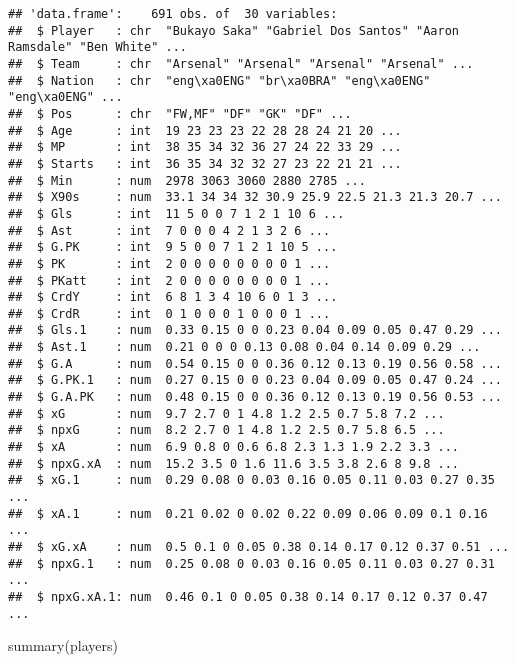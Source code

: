 \documentclass[
]{article}
\newenvironment{Shaded}{\begin{snugshade}}{\end{snugshade}}
\newcommand{\FunctionTok}[1]{\textcolor[rgb]{0.00,0.00,0.00}{#1}}
\newcommand{\NormalTok}[1]{#1}
\begin{document}
\begin{verbatim}
## 'data.frame':    691 obs. of  30 variables:
##  $ Player   : chr  "Bukayo Saka" "Gabriel Dos Santos" "Aaron Ramsdale" "Ben White" ...
##  $ Team     : chr  "Arsenal" "Arsenal" "Arsenal" "Arsenal" ...
##  $ Nation   : chr  "eng\xa0ENG" "br\xa0BRA" "eng\xa0ENG" "eng\xa0ENG" ...
##  $ Pos      : chr  "FW,MF" "DF" "GK" "DF" ...
##  $ Age      : int  19 23 23 23 22 28 28 24 21 20 ...
##  $ MP       : int  38 35 34 32 36 27 24 22 33 29 ...
##  $ Starts   : int  36 35 34 32 32 27 23 22 21 21 ...
##  $ Min      : num  2978 3063 3060 2880 2785 ...
##  $ X90s     : num  33.1 34 34 32 30.9 25.9 22.5 21.3 21.3 20.7 ...
##  $ Gls      : int  11 5 0 0 7 1 2 1 10 6 ...
##  $ Ast      : int  7 0 0 0 4 2 1 3 2 6 ...
##  $ G.PK     : int  9 5 0 0 7 1 2 1 10 5 ...
##  $ PK       : int  2 0 0 0 0 0 0 0 0 1 ...
##  $ PKatt    : int  2 0 0 0 0 0 0 0 0 1 ...
##  $ CrdY     : int  6 8 1 3 4 10 6 0 1 3 ...
##  $ CrdR     : int  0 1 0 0 0 1 0 0 0 1 ...
##  $ Gls.1    : num  0.33 0.15 0 0 0.23 0.04 0.09 0.05 0.47 0.29 ...
##  $ Ast.1    : num  0.21 0 0 0 0.13 0.08 0.04 0.14 0.09 0.29 ...
##  $ G.A      : num  0.54 0.15 0 0 0.36 0.12 0.13 0.19 0.56 0.58 ...
##  $ G.PK.1   : num  0.27 0.15 0 0 0.23 0.04 0.09 0.05 0.47 0.24 ...
##  $ G.A.PK   : num  0.48 0.15 0 0 0.36 0.12 0.13 0.19 0.56 0.53 ...
##  $ xG       : num  9.7 2.7 0 1 4.8 1.2 2.5 0.7 5.8 7.2 ...
##  $ npxG     : num  8.2 2.7 0 1 4.8 1.2 2.5 0.7 5.8 6.5 ...
##  $ xA       : num  6.9 0.8 0 0.6 6.8 2.3 1.3 1.9 2.2 3.3 ...
##  $ npxG.xA  : num  15.2 3.5 0 1.6 11.6 3.5 3.8 2.6 8 9.8 ...
##  $ xG.1     : num  0.29 0.08 0 0.03 0.16 0.05 0.11 0.03 0.27 0.35 ...
##  $ xA.1     : num  0.21 0.02 0 0.02 0.22 0.09 0.06 0.09 0.1 0.16 ...
##  $ xG.xA    : num  0.5 0.1 0 0.05 0.38 0.14 0.17 0.12 0.37 0.51 ...
##  $ npxG.1   : num  0.25 0.08 0 0.03 0.16 0.05 0.11 0.03 0.27 0.31 ...
##  $ npxG.xA.1: num  0.46 0.1 0 0.05 0.38 0.14 0.17 0.12 0.37 0.47 ...
\end{verbatim}

\begin{Shaded}
\begin{Highlighting}[]
\FunctionTok{summary}\NormalTok{(players)}
\end{Highlighting}
\end{Shaded}
\end{document}
